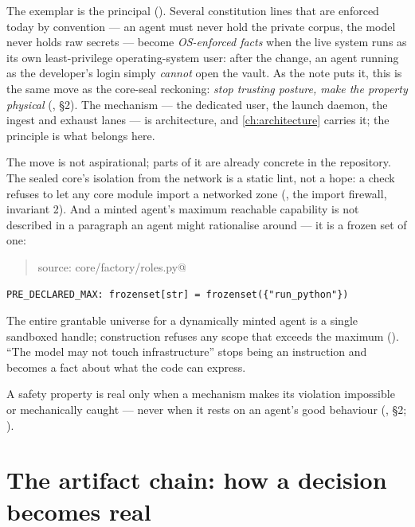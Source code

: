 The exemplar is the \Ouroboros{} principal ().
Several constitution lines that are enforced today by convention --- an agent must
never hold the private corpus, the model never holds raw secrets --- become
\emph{OS-enforced facts} when the live system runs as its own least-privilege
operating-system user: after the change, an agent running as the developer's login
simply \emph{cannot} open the vault. As the note puts it, this is the same move as
the core-seal reckoning: \emph{stop trusting posture, make the property physical}
(, \S 2). The mechanism --- the dedicated user, the
launch daemon, the ingest and exhaust lanes --- is architecture, and \autoref{ch:architecture}
carries it; the principle is what belongs here.

The move is not aspirational; parts of it are already concrete in the repository.
The sealed core's isolation from the network is a static lint, not a hope: a
check refuses to let any core module import a networked zone
(, the import firewall, invariant 2). And
a minted agent's maximum reachable capability is not described in a paragraph an
agent might rationalise around --- it is a frozen set of one:

\begin{quote}\small\ttfamily
source: core/factory/roles.py@\gitref
\end{quote}
\begin{verbatim}
PRE_DECLARED_MAX: frozenset[str] = frozenset({"run_python"})
\end{verbatim}
\noindent The entire grantable universe for a dynamically minted agent is a single
sandboxed handle; construction refuses any scope that exceeds the maximum
(). ``The model may not touch
infrastructure'' stops being an instruction and becomes a fact about what the code
can express.

\begin{principle}
A safety property is real only when a mechanism makes its violation impossible or
mechanically caught --- never when it rests on an agent's good behaviour
(, \S 2; ).
\end{principle}

\section{The artifact chain: how a decision becomes real}
\label{sec:artifact-chain}

